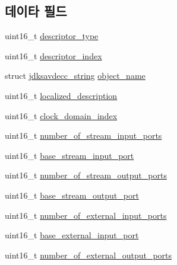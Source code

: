 \subsection*{데이타 필드}
\begin{DoxyCompactItemize}
\item 
uint16\+\_\+t \hyperlink{structjdksavdecc__descriptor__sensor__unit_ab7c32b6c7131c13d4ea3b7ee2f09b78d}{descriptor\+\_\+type}
\item 
uint16\+\_\+t \hyperlink{structjdksavdecc__descriptor__sensor__unit_a042bbc76d835b82d27c1932431ee38d4}{descriptor\+\_\+index}
\item 
struct \hyperlink{structjdksavdecc__string}{jdksavdecc\+\_\+string} \hyperlink{structjdksavdecc__descriptor__sensor__unit_a7d1f5945a13863b1762fc6db74fa8f80}{object\+\_\+name}
\item 
uint16\+\_\+t \hyperlink{structjdksavdecc__descriptor__sensor__unit_a0926f846ca65a83ad5bb06b4aff8f408}{localized\+\_\+description}
\item 
uint16\+\_\+t \hyperlink{structjdksavdecc__descriptor__sensor__unit_a6608f023d147b556a49527d568abed8e}{clock\+\_\+domain\+\_\+index}
\item 
uint16\+\_\+t \hyperlink{structjdksavdecc__descriptor__sensor__unit_ad00c23883f3271704e11719abc6f7ad7}{number\+\_\+of\+\_\+stream\+\_\+input\+\_\+ports}
\item 
uint16\+\_\+t \hyperlink{structjdksavdecc__descriptor__sensor__unit_a8ad4ba35aee3ad22d5e946438bbaba53}{base\+\_\+stream\+\_\+input\+\_\+port}
\item 
uint16\+\_\+t \hyperlink{structjdksavdecc__descriptor__sensor__unit_a6b331604e3f2b2db126dbf0a7c81b0fa}{number\+\_\+of\+\_\+stream\+\_\+output\+\_\+ports}
\item 
uint16\+\_\+t \hyperlink{structjdksavdecc__descriptor__sensor__unit_a234b990d7bb2f22da0ba4bebadc71a70}{base\+\_\+stream\+\_\+output\+\_\+port}
\item 
uint16\+\_\+t \hyperlink{structjdksavdecc__descriptor__sensor__unit_a7e5320abe3b528f879c3314a19269335}{number\+\_\+of\+\_\+external\+\_\+input\+\_\+ports}
\item 
uint16\+\_\+t \hyperlink{structjdksavdecc__descriptor__sensor__unit_a292b30d547e9769f7ec471a9e26ae2c2}{base\+\_\+external\+\_\+input\+\_\+port}
\item 
uint16\+\_\+t \hyperlink{structjdksavdecc__descriptor__sensor__unit_ae7140af180c1c9cc1f5a6a414fe26ebb}{number\+\_\+of\+\_\+external\+\_\+output\+\_\+ports}
\item 

\end{DoxyCompactItemize}
